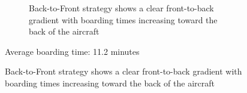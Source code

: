 \documentclass[landscape]{article}
\begin{document}
\begin{figure}
\begin{subfigure}{\textwidth}
        \caption{Back-to-Front strategy shows a clear front-to-back gradient with boarding times increasing toward the back of the aircraft}
    \end{subfigure}
    
    \vspace{-0.5cm}
    \begin{center}
        Average boarding time: 11.2 minutes
    \end{center}
\end{figure}

\clearpage
\end{document}

